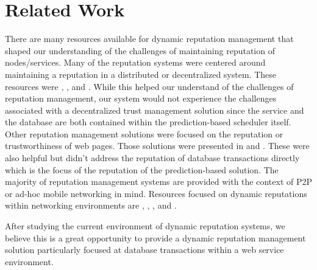 \section{Related Work}
\label{rep:related_work}

There are many resources available for dynamic reputation management that shaped our understanding of the challenges of maintaining reputation of nodes/services. Many of the reputation systems were centered around maintaining a reputation in a distributed or decentralized system. These resources were \cite{clark_dynamic_2017}, \cite{de_paola_reputation_2008}, and  \cite{hu_reputation_2010}. While this helped our understand of the challenges of reputation management, our system would not experience the challenges associated with a decentralized trust management solution since the service and the database are both contained within the prediction-based scheduler itself. Other reputation management solutions were focused on the reputation or trustworthiness of web pages. Those solutions were presented in \cite{wang_research_2008} and \cite{melnikov_towards_2018}. These were also helpful but didn't address the reputation of database transactions directly which is the focus of the reputation of the prediction-based solution. The majority of reputation management systems are provided with the context of P2P or ad-hoc mobile networking in mind. Resources focused on dynamic reputations within networking environments are \cite{sun_dynamic_2019}, \cite{chiejina_dynamic_2014}, \cite{hu_reputation_2010}, and \cite{de_paola_reputation_2008}.

After studying the current environment of dynamic reputation systems, we believe this is a great opportunity to provide a dynamic reputation management solution particularly focused at database transactions within a web service environment.
